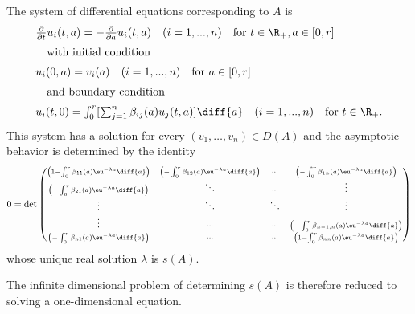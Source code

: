 \begin{example}
The system of differential equations corresponding to $A$ is
\begin{equation} \label{eq:c4-3.13}
\begin{array}{l}
\frac{\partial}{\partial t}u_i(t,a) = - \frac{\partial}{\partial a}u_i(t,a) \quad (i=1,...,n) \quad \text{for } t\in\R_+, a\in[0,r]\\[2mm]
\quad \text{with initial condition} \\[2mm]
u_i(0,a) = v_i(a) \quad (i=1,...,n) \quad \text{for } a\in[0,r] \\[2mm]
\quad \text{and boundary condition} \\[2mm]
u_i(t,0) = \int_0^r [\sum_{j=1}^n \beta_{ij}(a)u_j(t,a)]\diff{a} \quad (i=1,...,n) \quad \text{for } t\in\R_+.
\end{array}
\end{equation}
This system has a solution for every $(v_{1}, \ldots, v_{n}) \in D(A)$ and the asymptotic behavior is determined by the identity
\[
0 = \det
\begin{pmatrix}\scriptstyle{
 \left(1 - \int_{0}^{r} \beta_{11}(a)\eu^{-\lambda a} \diff{a}\right)} 
  & \scriptstyle{ \left(-\int_{0}^{r} \beta_{12}(a)\eu^{-\lambda a} \diff{a}\right)} 
  & \scriptstyle{\cdots} 
  & \scriptstyle{ \left(-\int_{0}^{r} \beta_{1n}(a)\eu^{-\lambda a} \diff{a}\right)} \\
\scriptstyle{ \left(-\int_{0}^{r} \beta_{21}(a)\eu^{-\lambda a} \diff{a}\right)} 
  & \scriptstyle{\ddots} 
  & \scriptstyle{\cdots}
  & \scriptstyle{\vdots} \\
\scriptstyle{\vdots}
  & \scriptstyle{\ddots}  
  & \scriptstyle{\ddots}   
  & \scriptstyle{\vdots}  \\
\vdots
  & \scriptstyle{\cdots}  
  & \scriptstyle{\cdots}
  & \scriptstyle{ \left(-\int_{0}^{r} \beta_{n-1,n}(a)\eu^{-\lambda a} \diff{a}\right)} \\
\scriptstyle{ \left(-\int_{0}^{r} \beta_{n1}(a)\eu^{-\lambda a} \diff{a}\right)} 
  & \scriptstyle{\cdots} 
  & \scriptstyle{\cdots}
  & \scriptstyle{ \left(1 - \int_{0}^{r} \beta_{nn}(a)\eu^{-\lambda a} \diff{a}\right)}
\end{pmatrix}
\]
whose unique real solution $\lambda$ is $s(A)$.

The infinite dimensional problem of determining $s(A)$ is therefore reduced to solving a one-dimensional equation.
\end{example}

